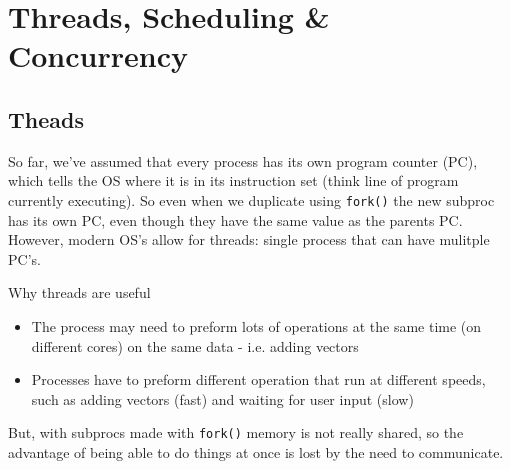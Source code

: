 \documentclass[a4paper, 10pt]{article}
\begin{document}
\section{Threads, Scheduling \& Concurrency}
\subsection{Theads}
So far, we've assumed that every process has its own program counter (PC), which tells the OS where it is in its instruction set (think line of program currently executing). So even when we duplicate using \texttt{fork()} the new subproc has its own PC, even though they have the same value as the parents PC. \\[2ex]
However, modern OS's allow for threads: single process that can have mulitple PC's.

\begin{conceptbox}{Why threads are useful}{}
    \begin{itemize}
        \item The process may need to preform lots of operations at the same time (on different cores) on the same data - i.e. adding vectors
        \item Processes have to preform different operation that run at different speeds, such as adding vectors (fast) and waiting for user input (slow)
    \end{itemize}
\end{conceptbox}
But, with subprocs made with \texttt{fork()} memory is not really shared, so the advantage of being able to do things at once is lost by the need to communicate.
\end{document}
